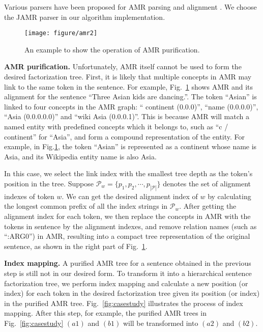 Various parsers have been proposed for AMR parsing and alignment \cite{flanigan2014discriminative,wang2015boosting}. We choose the JAMR parser \cite{flanigan2014discriminative} in our algorithm implementation. 

\begin{figure}[tb]
\centering
\texttt{[image: figure/amr2]}
\vspace{0mm}
\caption{An example to show the operation of AMR purification.}
\label{fig:amr2}
\vspace{-3mm}
\end{figure}


\textbf{AMR purification.} Unfortunately, AMR itself cannot be used to form the desired factorization tree. 
First, it is likely that multiple concepts in AMR may link to the same token in the sentence.
For example, Fig.~\ref{fig:amr2} shows AMR and its alignment for the sentence ``Three Asian kids are dancing.''.
The token ``Asian'' is linked to four concepts in the AMR graph: `` continent (0.0.0)'', ``name (0.0.0.0)'', ``Asia (0.0.0.0.0)'' and ``wiki Asia (0.0.0.1)''.
This is because AMR will match a named entity with predefined concepts which it belongs to, such as ``c / continent'' for ``Asia'', and form a compound representation of the entity. For example, in Fig.\ref{fig:amr2}, the token ``Asian'' is represented as a continent whose name is Asia, and its Wikipedia entity name is also Asia.

In this case, we select the link index with the smallest tree depth as the token's position in the tree.
Suppose $\mathcal{P}_w = \{p_1, p_2, \cdots, p_{|\mathcal{P}|}\}$ denotes the set of alignment indexes of token $w$.
We can get the desired alignment index of $w$ by calculating the longest common prefix of all the index strings in  $\mathcal{P}_w$.
After getting the alignment index for each token, we then replace the concepts in AMR with the tokens in sentence by the alignment indexes, and remove relation names (such as ``:ARG0'') in AMR, resulting into a compact tree representation of the original sentence, as shown in the right part of Fig.~\ref{fig:amr2}.


\textbf{Index mapping.}
A purified AMR tree for a sentence obtained in the previous step is still not in our desired form.
To transform it into a hierarchical sentence factorization tree, we perform index mapping and calculate a new position (or index) for each token in the desired factorization tree given its position (or index) in the purified AMR tree.
Fig.~\ref{fig:casestudy} illustrates the process of index mapping. After this step, for example, the purified AMR trees in Fig.~\ref{fig:casestudy} $(a1)$ and $(b1)$ will be transformed into $(a2)$ and $(b2)$.

